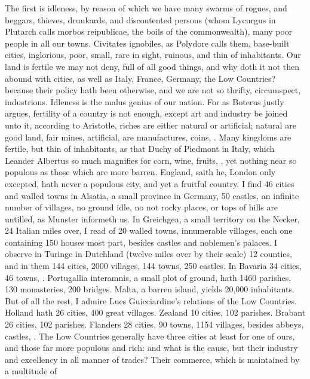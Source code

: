 {The first is idleness, by reason of which we have many swarms of
rogues, and beggars, thieves, drunkards, and discontented persons (whom
Lycurgus in Plutarch calls morbos reipublicae, the boils of the
commonwealth), many poor people in all our towns. Civitates ignobiles,
as Polydore calls them, base-built cities, inglorious, poor,
small, rare in sight, ruinous, and thin of inhabitants. Our land is
fertile we may not deny, full of all good things, and why doth it not
then abound with cities, as well as Italy, France, Germany, the Low
Countries? because their policy hath been otherwise, and we are not so
thrifty, circumspect, industrious. Idleness is the malus genius of our
nation. For as Boterus justly argues, fertility of a country is
not enough, except art and industry be joined unto it, according to
Aristotle, riches are either natural or artificial; natural are good
land, fair mines, \etc{} artificial, are manufactures, coins, \etc{}. Many
kingdoms are fertile, but thin of inhabitants, as that Duchy of
Piedmont in Italy, which Leander Albertus so much magnifies for corn,
wine, fruits, \etc{}, yet nothing near so populous as those which are more
barren. England, saith he, London only excepted, hath never a
populous city, and yet a fruitful country. I find 46 cities and walled
towns in Alsatia, a small province in Germany, 50 castles, an infinite
number of villages, no ground idle, no not rocky places, or tops of
hills are untilled, as Munster informeth us. In Greichgea, a
small territory on the Necker, 24 Italian miles over, I read of 20
walled towns, innumerable villages, each one containing 150 houses most
part, besides castles and noblemen's palaces. I observe in Turinge
in Dutchland (twelve miles over by their scale) 12 counties, and in
them 144 cities, 2000 villages, 144 towns, 250 castles. In Bavaria
34 cities, 46 towns, \etc{}. Portugallia interamnis, a small plot of
ground, hath 1460 parishes, 130 monasteries, 200 bridges. Malta, a
barren island, yields 20,000 inhabitants. But of all the rest, I admire
Lues Guicciardine's relations of the Low Countries. Holland hath 26
cities, 400 great villages. Zealand 10 cities, 102 parishes. Brabant 26
cities, 102 parishes. Flanders 28 cities, 90 towns, 1154 villages,
besides abbeys, castles, \etc{}. The Low Countries generally have three
cities at least for one of ours, and those far more populous and rich:
and what is the cause, but their industry and excellency in all manner
of trades? Their commerce, which is maintained by a multitude of
}
